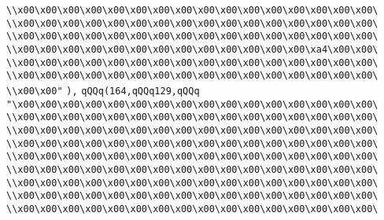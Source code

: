 \verb|\\x00\x00\x00\x00\x00\x00\x00\x00\x00\x00\x00\x00\x00\x00\x00\x00\|\newline
\verb|\\x00\x00\x00\x00\x00\x00\x00\x00\x00\x00\x00\x00\x00\x00\x00\x00\|\newline
\verb|\\x00\x00\x00\x00\x00\x00\x00\x00\x00\x00\x00\x00\x00\x00\x00\x00\|\newline
\verb|\\x00\x00\x00\x00\x00\x00\x00\x00\x00\x00\x00\x00\x00\xa4\x00\x00\|\newline
\verb|\\x00\x00\x00\x00\x00\x00\x00\x00\x00\x00\x00\x00\x00\x00\x00\x00\|\newline
\verb|\\x00\x00\x00\x00\x00\x00\x00\x00\x00\x00\x00\x00\x00\x00\x00\x00\|\newline
\verb|\\x00\x00"|\newline
\verb|),|\newline
\verb|qQQq(164,qQQq129,qQQq|\newline
\verb|"\x00\x00\x00\x00\x00\x00\x00\x00\x00\x00\x00\x00\x00\x00\x00\x00\|\newline
\verb|\\x00\x00\x00\x00\x00\x00\x00\x00\x00\x00\x00\x00\x00\x00\x00\x00\|\newline
\verb|\\x00\x00\x00\x00\x00\x00\x00\x00\x00\x00\x00\x00\x00\x00\x00\x00\|\newline
\verb|\\x00\x00\x00\x00\x00\x00\x00\x00\x00\x00\x00\x00\x00\x00\x00\x00\|\newline
\verb|\\x00\x00\x00\x00\x00\x00\x00\x00\x00\x00\x00\x00\x00\x00\x00\x00\|\newline
\verb|\\x00\x00\x00\x00\x00\x00\x00\x00\x00\x00\x00\x00\x00\x00\x00\x00\|\newline
\verb|\\x00\x00\x00\x00\x00\x00\x00\x00\x00\x00\x00\x00\x00\x00\x00\x00\|\newline
\verb|\\x00\x00\x00\x00\x00\x00\x00\x00\x00\x00\x00\x00\x00\x00\x00\x00\|\newline
\verb|\\x00\x00\x00\x00\x00\x00\x00\x00\x00\x00\x00\x00\x00\x00\x00\x00\|\newline

